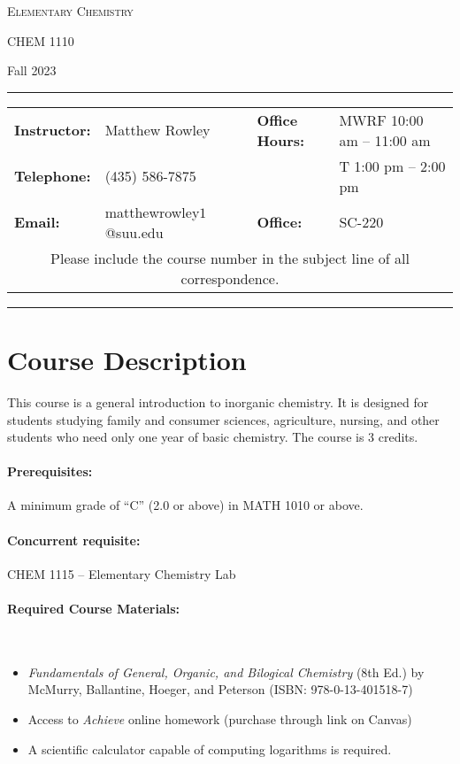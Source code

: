 \documentclass[12pt, letterpaper]{article}
\begin{document}
\begin{center}
	{\Large \textsc{Elementary Chemistry}}

	CHEM 1110
\end{center}
\begin{center}
	{\large Fall 2023}
\end{center}
\begin{center}
	\rule{0.99\textwidth}{0.4pt}
	\begin{tabular}{llcll}
		\textbf{Instructor:} & Matthew Rowley           &  & \textbf{Office Hours:} & MWRF 10:00 am -- 11:00 am \\
		\textbf{Telephone:}  & (435) 586-7875           &  &                        & T 1:00 pm -- 2:00 pm    \\
		\textbf{Email:}      & matthewrowley$1$@suu.edu &  & \textbf{Office:}       & SC-220                   \\
		\multicolumn{5}{c}{Please include the course number in the subject line of all correspondence.}
	\end{tabular}
	\rule{0.99\textwidth}{0.4pt}
\end{center}

\section*{Course Description}
This course is a general introduction to inorganic chemistry. It is designed for students studying family and consumer sciences, agriculture, nursing, and other students who need only one year of basic chemistry. The course is 3 credits.

\paragraph{Prerequisites:}
A minimum grade of ``C'' (2.0 or above) in MATH 1010 or above.

\paragraph{Concurrent requisite:}
CHEM 1115 -- Elementary Chemistry Lab

\paragraph{Required Course Materials:} ~

\begin{itemize}
	\item \emph{Fundamentals of General, Organic, and Bilogical Chemistry} (8th Ed.) by McMurry, Ballantine, Hoeger, and Peterson (ISBN: 978-0-13-401518-7)
	\item Access to \emph{Achieve} online homework (purchase through link on Canvas)
	\item A scientific calculator capable of computing logarithms is required.
\end{itemize}
\end{document}
